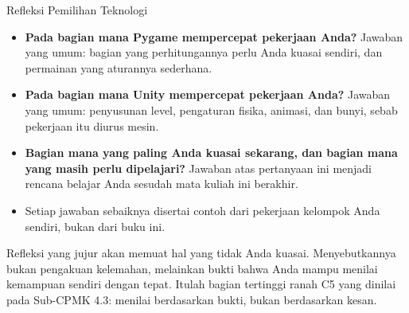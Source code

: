 \documentclass[aspectratio=169,10pt]{beamer}
\begin{document}
\begin{frame}{Refleksi Pemilihan Teknologi}
\begin{itemize}
  \item \textbf{Pada bagian mana Pygame mempercepat pekerjaan Anda?} Jawaban
        yang umum: bagian yang perhitungannya perlu Anda kuasai sendiri, dan
        permainan yang aturannya sederhana.
  \item \textbf{Pada bagian mana Unity mempercepat pekerjaan Anda?} Jawaban
        yang umum: penyusunan level, pengaturan fisika, animasi, dan bunyi,
        sebab pekerjaan itu diurus mesin.
  \item \textbf{Bagian mana yang paling Anda kuasai sekarang, dan bagian mana
        yang masih perlu dipelajari?} Jawaban atas pertanyaan ini menjadi
        rencana belajar Anda sesudah mata kuliah ini berakhir.
  \item Setiap jawaban sebaiknya disertai contoh dari pekerjaan kelompok Anda
        sendiri, bukan dari buku ini.
\end{itemize}
\vspace{0.14cm}
\begin{kotak}
Refleksi yang jujur akan memuat hal yang tidak Anda kuasai. Menyebutkannya bukan
pengakuan kelemahan, melainkan bukti bahwa Anda mampu menilai kemampuan sendiri
dengan tepat. Itulah bagian tertinggi ranah C5 yang dinilai pada Sub-CPMK 4.3:
menilai berdasarkan bukti, bukan berdasarkan kesan.
\end{kotak}
\end{frame}
\end{document}
